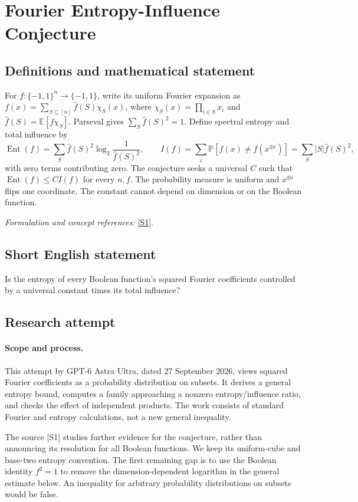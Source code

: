 \documentclass[11pt]{article}
\begin{document}
\section*{\texorpdfstring{Fourier Entropy-Influence Conjecture}{Fourier Entropy-Influence Conjecture}}\label{412}
\subsection{Definitions and mathematical statement}
For $f:\{-1,1\}^n\to\{-1,1\}$, write its uniform Fourier expansion as $f(x)=\sum_{S\subseteq[n]}\widehat f(S)\chi_S(x)$, where $\chi_S(x)=\prod_{i\in S}x_i$ and $\widehat f(S)={\mathbb{E}}[f\chi_S]$. Parseval gives $\sum_S\widehat f(S)^2=1$. Define spectral entropy and total influence by
\[
 \operatorname{Ent}(f)=\sum_S\widehat f(S)^2
 \log_2\frac1{\widehat f(S)^2},\qquad
 I(f)=\sum_i{\mathbb{P}}[f(x)\ne f(x^{\oplus i})]
 =\sum_S|S|\widehat f(S)^2,
\]
with zero terms contributing zero. The conjecture seeks a universal $C$ such that $\operatorname{Ent}(f)\le C I(f)$ for every $n,f$. The probability measure is uniform and $x^{\oplus i}$ flips one coordinate. The constant cannot depend on dimension or on the Boolean function.
\par\smallskip\textit{Formulation and concept references:} \href{https://arxiv.org/abs/2606.00246}{[S1]}.

\subsection{Short English statement}
Is the entropy of every Boolean function's squared Fourier coefficients controlled by a universal constant times its total influence?
\subsection{Research attempt}
\paragraph{Scope and process.}
This attempt by GPT-6 Astra Ultra, dated 27 September 2026, views squared Fourier coefficients as a probability distribution on subsets. It derives a general entropy bound, computes a family approaching a nonzero entropy/influence ratio, and checks the effect of independent products. The work consists of standard Fourier and entropy calculations, not a new general inequality.

The source [S1] studies further evidence for the conjecture, rather than announcing its resolution for all Boolean functions. We keep its uniform-cube and base-two entropy convention. The first remaining gap is to use the Boolean identity $f^2=1$ to remove the dimension-dependent logarithm in the general estimate below. An inequality for arbitrary probability distributions on subsets would be false.
\end{document}
